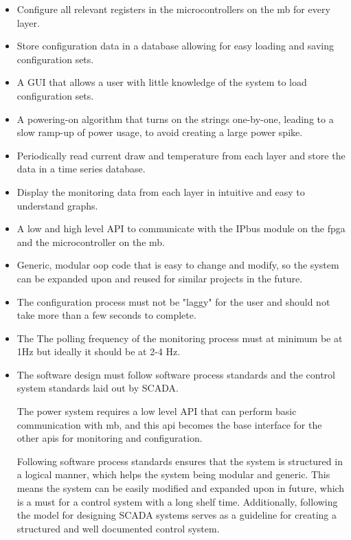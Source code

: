 \documentclass[main.tex]{subfiles}
\begin{document}
\begin{itemize}
    \item Configure all relevant registers in the microcontrollers on the \gls{mb} for every layer.
    \item Store configuration data in a database allowing for easy loading and saving configuration sets.
    \item A GUI that allows a user with little knowledge of the system to load configuration sets.
    \item A powering-on algorithm that turns on the strings one-by-one, leading to a slow ramp-up of power usage, to avoid creating a large power spike.
    \item Periodically read current draw and temperature from each layer and store the data in a time series database.
    \item Display the monitoring data from each layer in intuitive and easy to understand graphs.
    \item A low and high level API to communicate with the IPbus module on the \acrshort{fpga} and the microcontroller on the \gls{mb}.
    \item Generic, modular \acrshort{oop} code that is easy to change and modify, so the system can be expanded upon and reused for similar projects in the future.
    \item The configuration process must not be "laggy" for the user and should not take more than a few seconds to complete.
    \item The The polling frequency of the monitoring process must at minimum be at 1Hz but ideally it should be at 2-4 Hz.
    \item The software design must follow software process standards and the control system standards laid out by SCADA.
    
The power system requires a low level API that can perform basic communication with \gls{mb}, and this \gls{api} becomes the base interface for the other \gls{api}s for monitoring and configuration. 

Following software process standards ensures that the system is structured in a logical manner, which helps the system being modular and generic. This means the system can be easily modified and expanded upon in future, which is a must for a control system with a long shelf time. Additionally, following the model for designing SCADA systems serves as a guideline for creating a structured and well documented control system.
    
    
\end{itemize}
\end{document}
